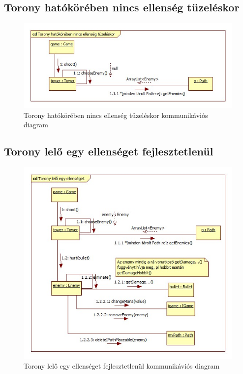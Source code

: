 \subsection{Torony hatókörében nincs ellenség tüzeléskor}
\begin{figure}[H]
\begin{center}
\includegraphics[width=17cm]{chapters/chapter05/images/cd_Torony_hatokoreben_nincs_ellenseg_tuzeleskor.jpg}
\caption{Torony hatókörében nincs ellenség tüzeléskor kommunikáviós diagram}
\label{fig:cd_Torony_hatokoreben_nincs_ellenseg_tuzeleskor}
\end{center}
\end{figure}

\subsection{Torony lelő egy ellenséget fejlesztetlenül}
\begin{figure}[H]
\begin{center}
\includegraphics[width=17cm]{chapters/chapter05/images/cd_Torony_lelo_egy_ellenseget_fejlesztetlenul.jpg}
\caption{Torony lelő egy ellenséget fejlesztetlenül kommunikáviós diagram}
\label{fig:cd_Torony_lelo_egy_ellenseget_fejlesztetlenul}
\end{center}
\end{figure}

